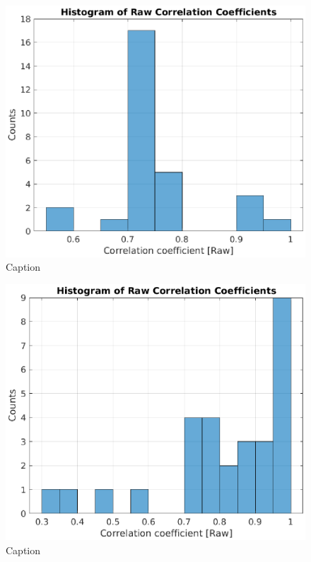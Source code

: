 \documentclass[11pt,letterpaper]{article}
\begin{document}
\begin{figure}
    \centering
    \includegraphics[width=0.7\linewidth]{Figures/Plots/raw_cc_histogram.eps}
    \caption{Caption}
    \label{fig:raw_cc_histogram}
\end{figure}

\begin{figure}
    \centering
    \includegraphics[width=0.7\linewidth]{Figures/Plots/filtered_cc_histogram.eps}
    \caption{Caption}
    \label{fig:filtered_cc_histogram}
\end{figure}
\end{document}
